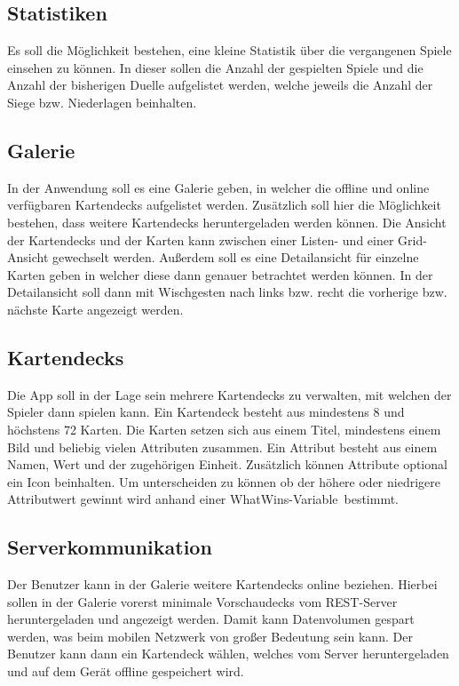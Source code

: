 \subsection{Statistiken}

Es soll die Möglichkeit bestehen, eine kleine Statistik über die vergangenen Spiele einsehen zu können. In dieser sollen die Anzahl der gespielten Spiele und die Anzahl der bisherigen Duelle aufgelistet werden, welche jeweils die Anzahl der Siege bzw. Niederlagen beinhalten.

\subsection{Galerie}

In der Anwendung soll es eine Galerie geben, in welcher die offline und online verfügbaren Kartendecks aufgelistet werden. Zusätzlich soll hier die Möglichkeit bestehen, dass weitere Kartendecks heruntergeladen werden können. Die Ansicht der Kartendecks und der Karten kann zwischen einer Listen- und einer Grid-Ansicht gewechselt werden. Außerdem soll es eine Detailansicht für einzelne Karten geben in welcher diese dann genauer betrachtet werden können. In der Detailansicht soll dann mit Wischgesten nach links bzw. recht die vorherige bzw. nächste Karte angezeigt werden.

\subsection{Kartendecks}

Die App soll in der Lage sein mehrere Kartendecks zu verwalten, mit welchen der Spieler dann spielen kann. Ein Kartendeck besteht aus mindestens 8 und höchstens 72 Karten. Die Karten setzen sich aus einem Titel, mindestens einem Bild und beliebig vielen Attributen zusammen. Ein Attribut besteht aus einem Namen, Wert und der zugehörigen Einheit. Zusätzlich können Attribute optional ein Icon beinhalten. Um unterscheiden zu können ob der höhere oder niedrigere Attributwert gewinnt wird anhand einer \glqq WhatWins-Variable\grqq\ bestimmt.

\subsection{Serverkommunikation}

Der Benutzer kann in der Galerie weitere Kartendecks online beziehen. Hierbei sollen in der Galerie vorerst minimale Vorschaudecks vom REST-Server heruntergeladen und angezeigt werden. Damit kann Datenvolumen gespart werden, was beim mobilen Netzwerk von großer Bedeutung sein kann. Der Benutzer kann dann ein Kartendeck wählen, welches vom Server heruntergeladen und auf dem Gerät offline gespeichert wird.

